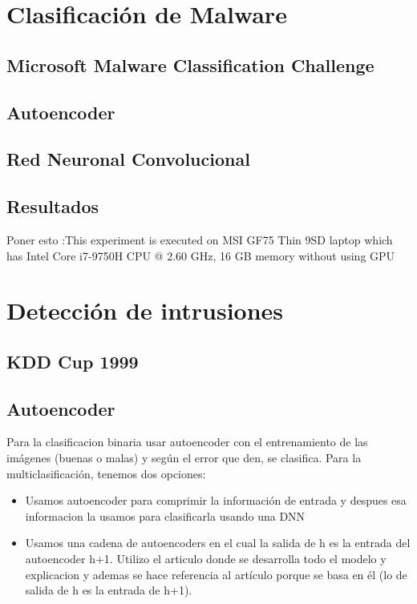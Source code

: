 \documentclass[12pt,a4paper]{book}
\begin{document}
\section{Clasificación de Malware}
\subsection{Microsoft Malware Classification Challenge}
\subsection{Autoencoder}
\subsection{Red Neuronal Convolucional}
\subsection{Resultados}
Poner esto :This experiment is executed on MSI GF75 Thin 9SD laptop which has Intel Core i7-9750H CPU @ 2.60 GHz, 16 GB memory without using GPU

\section{Detección de intrusiones}
\subsection{KDD Cup 1999}
\subsection{Autoencoder}
Para la clasificacion binaria usar autoencoder con el entrenamiento de las imágenes (buenas o malas) y según el error que den, se clasifica.
Para la multiclasificación, tenemos dos opciones:
\begin{itemize}
\item Usamos autoencoder para comprimir la información de entrada y despues esa informacion la usamos para clasificarla usando una DNN \citep{lopes2022effective}
\item Usamos una cadena de autoencoders en el cual la salida de h es la entrada del autoencoder h+1. Utilizo el articulo \citep{farahnakian2018deep} donde se desarrolla todo el modelo y explicacion y ademas se hace referencia al artículo \citep{bengio2006greedy} porque se basa en él (lo de salida de h es la entrada de h+1).
\end{itemize}
\end{document}

